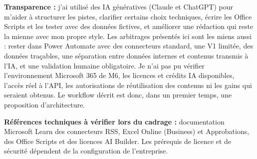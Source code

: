 \documentclass[10pt,a4paper]{article}
\newcommand{\humain}[1]{\textbf{\color{amber!85!black}#1 :}}
\begin{document}
\begin{encadre}
\humain{Transparence} j’ai utilisé des IA génératives (Claude et ChatGPT) pour m’aider à structurer les pistes, clarifier certains choix techniques, écrire les Office Scripts et les tester avec des données fictives, et améliorer une rédaction qui reste la mienne avec mon propre style. Les arbitrages présentés ici sont les miens aussi : rester dans Power Automate avec des connecteurs standard, une V1 limitée, des données traçables, une séparation entre données internes et contenus transmis à l’IA, et une validation humaine obligatoire. Je n’ai pas pu vérifier l’environnement Microsoft 365 de M6, les licences et crédits IA disponibles, l’accès réel à l’API, les autorisations de réutilisation des contenus ni les gains qui seraient obtenus. Le workflow décrit est donc, dans un premier temps, une proposition d’architecture.
\end{encadre}

{\scriptsize\color{muted}\textbf{Références techniques à vérifier lors du cadrage :} documentation Microsoft Learn des connecteurs RSS, Excel Online (Business) et Approbations, des Office Scripts et des licences AI Builder. Les prérequis de licence et de sécurité dépendent de la configuration de l’entreprise.\par}
\end{document}
